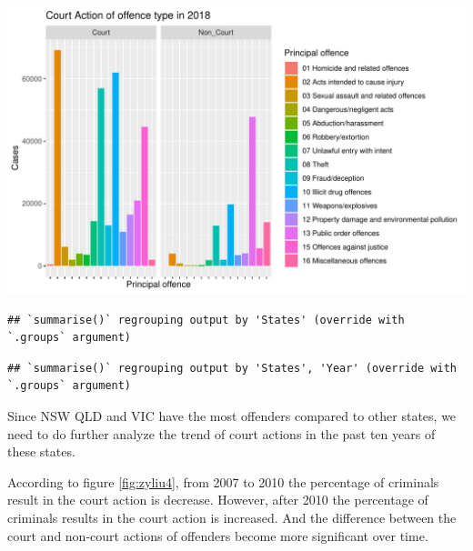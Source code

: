 \documentclass[11pt,a4paper,]{article}
\let\origfigure\figure
\let\endorigfigure\endfigure
\renewenvironment{figure}[1][2] {
\expandafter\origfigure\expandafter[H]
} {
\endorigfigure
}
\begin{document}
\begin{figure}

{\centering \includegraphics{ETC5513-Assignment4_files/figure-latex/zyliu3-1} 

}

\caption{Court Action of offence type in 2018}\label{fig:zyliu3}
\end{figure}

\begin{verbatim}
## `summarise()` regrouping output by 'States' (override with `.groups` argument)
\end{verbatim}

\begin{verbatim}
## `summarise()` regrouping output by 'States', 'Year' (override with `.groups` argument)
\end{verbatim}

Since NSW QLD and VIC have the most offenders compared to other states, we need to do further analyze the trend of court actions in the past ten years of these states.

According to figure \ref{fig:zyliu4}, from 2007 to 2010 the percentage of criminals result in the court action is decrease. However, after 2010 the percentage of criminals results in the court action is increased. And the difference between the court and non-court actions of offenders become more significant over time.
\end{document}
